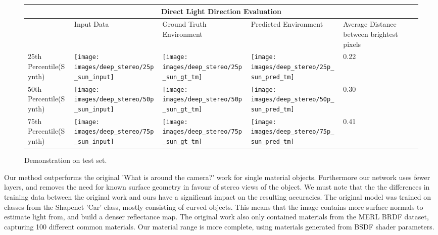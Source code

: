 \documentclass[ %
                    author={Gavin Parker},
                supervisor={Dr. Neill Campbell},
                    degree={MEng},
                     title={Deep Siamese Networks for Illumination Estimation from Stereo Images},
                  subtitle={},
                      type={Research},
                      year={2018} ]{dissertation}
\begin{document}
 \begin{figure}[H]
\centering
\begin{tabular}{ |p{3cm}||p{3cm}|p{3cm}|p{3cm}|p{3cm}|  }
 \hline
 \multicolumn{5}{|c|}{Direct Light Direction Evaluation} \\
 \hline
  & Input Data &Ground Truth Environment&Predicted Environment&Average Distance between brightest pixels\\
 \hline
 25th Percentile(Synth)&\parbox[c]{1em}{
 \texttt{[image: images/deep\_stereo/25p\_sun\_input]}}&\parbox[c]{1em}{\texttt{[image: images/deep\_stereo/25p\_sun\_gt\_tm]}}&
\parbox[c]{1em}{\texttt{[image: images/deep\_stereo/25p\_sun\_pred\_tm]}}& 0.22\\
 50th Percentile(Synth)&\parbox[c]{1em}{
 \texttt{[image: images/deep\_stereo/50p\_sun\_input]}}&\parbox[c]{1em}{\texttt{[image: images/deep\_stereo/50p\_sun\_gt\_tm]}}&
\parbox[c]{1em}{\texttt{[image: images/deep\_stereo/50p\_sun\_pred\_tm]}}& 0.30\\
 75th Percentile(Synth)&\parbox[c]{1em}{
 \texttt{[image: images/deep\_stereo/75p\_sun\_input]}}&\parbox[c]{1em}{\texttt{[image: images/deep\_stereo/75p\_sun\_gt\_tm]}}&
\parbox[c]{1em}{\texttt{[image: images/deep\_stereo/75p\_sun\_pred\_tm]}}& 0.41\\
 \hline
\end{tabular}

\label{sun_results}
\caption{Demonstration on test set.}

\end{figure}
Our method outperforms the original 'What is around the camera?' work for single material objects. Furthermore our network uses fewer layers, and removes the need for known surface geometry in favour of stereo views of the object. We must note that the the differences in training data between the original work and ours have a significant impact on the resulting accuracies. The original model was trained on classes from the Shapenet 'Car' class, mostly consisting of curved objects. This means that the image contains more surface normals to estimate light from, and build a denser reflectance map. The original work also only contained materials from the MERL BRDF dataset, capturing 100 different common materials. Our material range is more complete, using materials generated from BSDF shader parameters.
\end{document}
